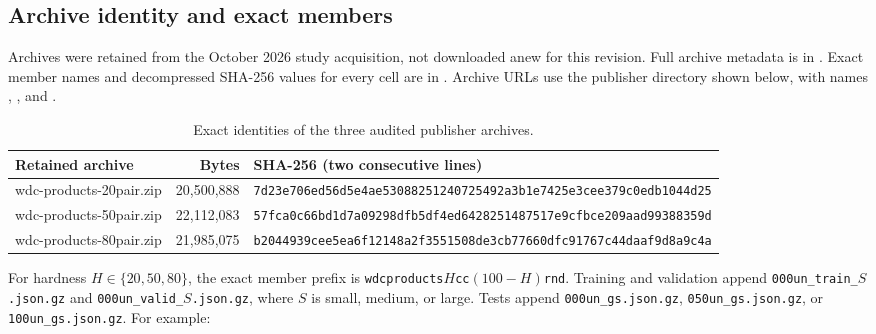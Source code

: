 \documentclass[11pt,letterpaper]{article}
\begin{document}
\subsection{Archive identity and exact members}
Archives were retained from the October 2026 study acquisition, not downloaded anew for this revision. Full archive metadata is in . Exact member names and decompressed SHA-256 values for every cell are in . Archive URLs use the publisher directory shown below, with names , , and .



\begin{table}[htbp]\centering\small\caption{Exact identities of the three audited publisher archives.}
\begin{tabular}{p{1.6in}rp{2.5in}}
\toprule Retained archive & Bytes & SHA-256 (two consecutive lines)\\\midrule
wdc-products-20pair.zip & 20,500,888 & \texttt{7d23e706ed56d5e4ae53088251240725}\newline\texttt{492a3b1e7425e3cee379c0edb1044d25}\\
wdc-products-50pair.zip & 22,112,083 & \texttt{57fca0c66bd1d7a09298dfb5df4ed642}\newline\texttt{8251487517e9cfbce209aad99388359d}\\
wdc-products-80pair.zip & 21,985,075 & \texttt{b2044939cee5ea6f12148a2f3551508d}\newline\texttt{e3cb77660dfc91767c44daaf9d8a9c4a}\\
\bottomrule\end{tabular}\end{table}


For hardness $H\in\{20,50,80\}$, the exact member prefix is \texttt{wdcproducts}$H$\texttt{cc}$(100-H)$\texttt{rnd}. Training and validation append \texttt{000un\_train\_}$S$\texttt{.json.gz} and \texttt{000un\_valid\_}$S$\texttt{.json.gz}, where $S$ is small, medium, or large. Tests append \texttt{000un\_gs.json.gz}, \texttt{050un\_gs.json.gz}, or \texttt{100un\_gs.json.gz}. For example:

\noindent{}\\
\\
\end{document}
